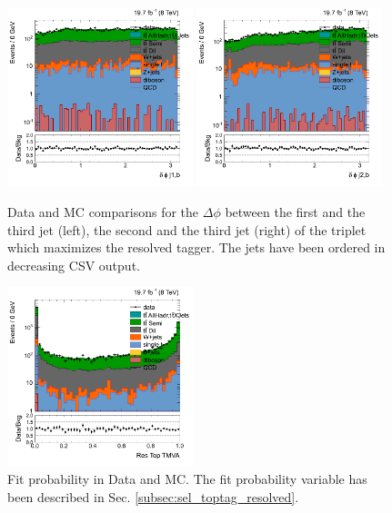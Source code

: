 \begin{figure}[htbp]
	\centering
	\includegraphics[width=0.48\textwidth]{figures/semilep_1tightmuo_resolved_3ormorejets_2ormorejetWPm_pfmetmore100_pfmtmore40_trigrequestonMC_17102015/hResBDTDPhij1b.png}
	\includegraphics[width=0.48\textwidth]{figures/semilep_1tightmuo_resolved_3ormorejets_2ormorejetWPm_pfmetmore100_pfmtmore40_trigrequestonMC_17102015/hResBDTDPhij2b.png}
	\caption{Data and MC comparisons for the $\Delta \phi$  between the first and the third jet (left), the second and the third jet (right) of the triplet which maximizes the resolved tagger. The jets have been ordered in decreasing CSV output.}
	\label{fig:dphij12b13TeV}
\end{figure}

\begin{figure}[htbp]
	\centering
	\includegraphics[width=0.48\textwidth]{figures/semilep_1tightmuo_resolved_3ormorejets_2ormorejetWPm_pfmetmore100_pfmtmore40_trigrequestonMC_17102015/hResProb.png}
	\caption{Fit probability in Data and MC. The fit probability variable has been described in Sec. \ref{subsec:sel_toptag_resolved}.}
	\label{fig:fitprob13TeV}
\end{figure}

